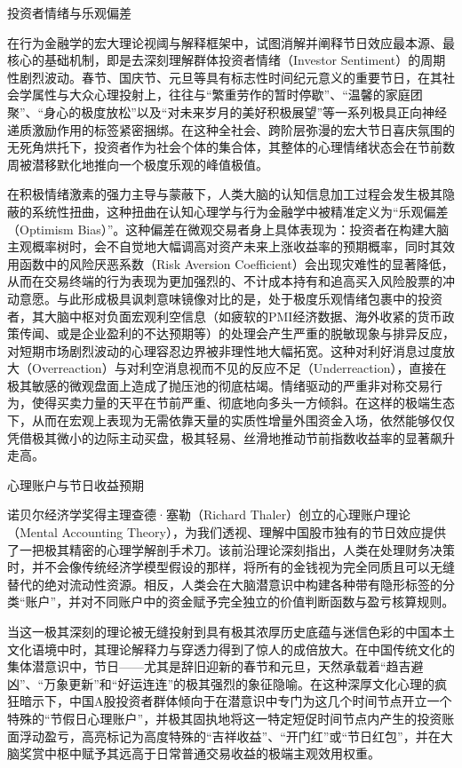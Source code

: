 \documentclass{cupb-thesis}
\begin{document}
投资者情绪与乐观偏差

在行为金融学的宏大理论视阈与解释框架中，试图消解并阐释节日效应最本源、最核心的基础机制，即是去深刻理解群体投资者情绪（Investor Sentiment）的周期性剧烈波动。春节、国庆节、元旦等具有标志性时间纪元意义的重要节日，在其社会学属性与大众心理投射上，往往与“繁重劳作的暂时停歇”、“温馨的家庭团聚”、“身心的极度放松”以及“对未来岁月的美好积极展望”等一系列极具正向神经递质激励作用的标签紧密捆绑。在这种全社会、跨阶层弥漫的宏大节日喜庆氛围的无死角烘托下，投资者作为社会个体的集合体，其整体的心理情绪状态会在节前数周被潜移默化地推向一个极度乐观的峰值极值。


在积极情绪激素的强力主导与蒙蔽下，人类大脑的认知信息加工过程会发生极其隐蔽的系统性扭曲，这种扭曲在认知心理学与行为金融学中被精准定义为“乐观偏差（Optimism Bias）”。这种偏差在微观交易者身上具体表现为：投资者在构建大脑主观概率树时，会不自觉地大幅调高对资产未来上涨收益率的预期概率，同时其效用函数中的风险厌恶系数（Risk Aversion Coefficient）会出现灾难性的显著降低，从而在交易终端的行为表现为更加强烈的、不计成本持有和追高买入风险股票的冲动意愿。与此形成极具讽刺意味镜像对比的是，处于极度乐观情绪包裹中的投资者，其大脑中枢对负面宏观利空信息（如疲软的PMI经济数据、海外收紧的货币政策传闻、或是企业盈利的不达预期等）的处理会产生严重的脱敏现象与排异反应，对短期市场剧烈波动的心理容忍边界被非理性地大幅拓宽。这种对利好消息过度放大（Overreaction）与对利空消息视而不见的反应不足（Underreaction），直接在极其敏感的微观盘面上造成了抛压池的彻底枯竭。情绪驱动的严重非对称交易行为，使得买卖力量的天平在节前严重、彻底地向多头一方倾斜。在这样的极端生态下，从而在宏观上表现为无需依靠天量的实质性增量外围资金入场，依然能够仅仅凭借极其微小的边际主动买盘，极其轻易、丝滑地推动节前指数收益率的显著飙升走高。


心理账户与节日收益预期

诺贝尔经济学奖得主理查德·塞勒（Richard Thaler）创立的心理账户理论（Mental Accounting Theory），为我们透视、理解中国股市独有的节日效应提供了一把极其精密的心理学解剖手术刀。该前沿理论深刻指出，人类在处理财务决策时，并不会像传统经济学模型假设的那样，将所有的金钱视为完全同质且可以无缝替代的绝对流动性资源。相反，人类会在大脑潜意识中构建各种带有隐形标签的分类“账户”，并对不同账户中的资金赋予完全独立的价值判断函数与盈亏核算规则。


当这一极其深刻的理论被无缝投射到具有极其浓厚历史底蕴与迷信色彩的中国本土文化语境中时，其理论解释力与穿透力得到了惊人的成倍放大。在中国传统文化的集体潜意识中，节日——尤其是辞旧迎新的春节和元旦，天然承载着“趋吉避凶”、“万象更新”和“好运连连”的极其强烈的象征隐喻。在这种深厚文化心理的疯狂暗示下，中国A股投资者群体倾向于在潜意识中专门为这几个时间节点开立一个特殊的“节假日心理账户”，并极其固执地将这一特定短促时间节点内产生的投资账面浮动盈亏，高亮标记为高度特殊的“吉祥收益”、“开门红”或“节日红包”，并在大脑奖赏中枢中赋予其远高于日常普通交易收益的极端主观效用权重。
\end{document}
